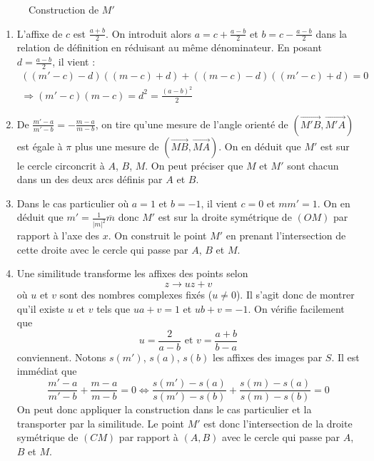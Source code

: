 \begin{figure}[h!]
 \centering
 
 \caption{Construction de $M'$}
 \label{fig:Ccomp10_1}
\end{figure}


\begin{enumerate}
 \item L'affixe de $c$ est $\frac{a+b}{2}$. On introduit alors $a = c + \frac{a-b}{2}$ et $b = c - \frac{a-b}{2}$ dans la relation de définition en réduisant au même dénominateur. En posant $d=\frac{a-b}{2}$, il vient :
\begin{multline*}
 ((m'-c) -d)((m-c) +d) + ((m-c)-d)((m'-c)+d)=0 \\
\Rightarrow (m'-c)(m-c) =  d^2 =\frac{(a-b)^2}{2}
\end{multline*}

 \item De $\frac{m'-a}{m'-b}=-\frac{m-a}{m-b}$, on tire qu'une mesure de l'angle orienté de $(\overrightarrow{M'B},\overrightarrow{M'A})$ est égale à $\pi$ plus une mesure de $(\overrightarrow{MB},\overrightarrow{MA})$. On en déduit que $M'$ est sur le cercle circoncrit à $A$, $B$, $M$. On peut préciser que $M$ et $M'$ sont chacun dans un des deux arcs définis par $A$ et $B$. 
 \item Dans le cas particulier où $a=1$ et $b=-1$, il vient $c=0$ et $mm'=1$. On en déduit que $m'=\frac{1}{|m|^2}\overline{m}$ donc $M'$ est sur la droite symétrique de $(OM)$ par rapport à l'axe des $x$. On construit le point $M'$ en prenant l'intersection de cette droite avec le cercle qui passe par $A$, $B$ et $M$. 
 \item Une similitude transforme les affixes des points selon
\begin{displaymath}
 z \rightarrow uz + v
\end{displaymath}
où $u$ et $v$ sont des nombres complexes fixés ($u\neq 0$). Il s'agit donc de montrer qu'il existe $u$ et $v$ tels que $ua+v=1$ et $ub+v=-1$. On vérifie facilement que 
\begin{displaymath}
 u=\frac{2}{a-b}\text{ et } v = \frac{a+b}{b-a}
\end{displaymath}
conviennent. Notons $s(m')$, $s(a)$, $s(b)$ les affixes des images par $S$. Il est immédiat que
\begin{displaymath}
 \frac{m'-a}{m'-b}+\frac{m-a}{m-b}=0
\Leftrightarrow
 \frac{s(m')-s(a)}{s(m')-s(b)}+\frac{s(m)-s(a)}{s(m)-s(b)}=0
\end{displaymath}
 On peut donc appliquer la construction dans le cas particulier et la transporter par la similitude. Le point $M'$ est donc l'intersection de la droite symétrique de $(CM)$ par rapport à $(A,B)$ avec le cercle qui passe par $A$, $B$ et $M$.
\end{enumerate}

